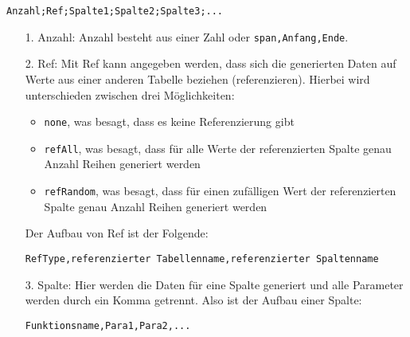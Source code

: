 \documentclass[11pt]{report}
\begin{document}
\texttt{Anzahl;Ref;Spalte1;Spalte2;Spalte3;...}

\begin{itemize}
\item[1.] Anzahl: Anzahl besteht aus einer Zahl oder \texttt{span,Anfang,Ende}.
\item[2.] Ref: Mit Ref kann angegeben werden, dass sich die generierten Daten auf Werte aus einer anderen Tabelle beziehen (referenzieren). Hierbei wird unterschieden zwischen drei Möglichkeiten:
\begin{itemize}
\item \texttt{none}, was besagt, dass es keine Referenzierung gibt
\item \texttt{refAll}, was besagt, dass für alle Werte der referenzierten Spalte genau Anzahl Reihen generiert werden
\item \texttt{refRandom}, was besagt, dass für einen zufälligen Wert der referenzierten Spalte genau Anzahl Reihen generiert werden
\end{itemize}
Der Aufbau von Ref ist der Folgende:

\texttt{RefType,referenzierter Tabellenname,referenzierter Spaltenname}

\item[3.] Spalte: Hier werden die Daten für eine Spalte generiert und alle Parameter werden durch ein Komma getrennt. Also ist der Aufbau einer Spalte:

\texttt{Funktionsname,Para1,Para2,...}

\end{itemize}
\end{document}
